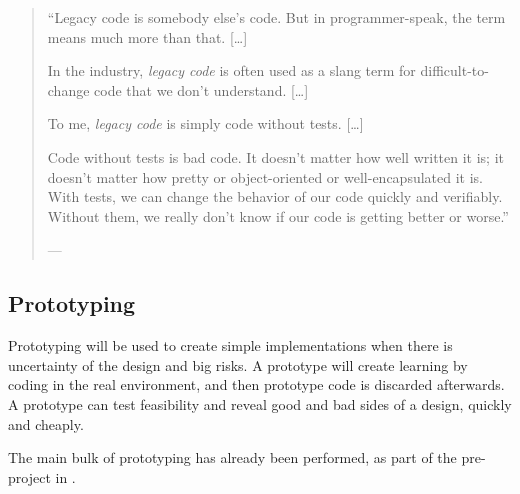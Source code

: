 \begin{quotation}
``Legacy code is somebody else’s code. But in programmer-speak, the term means much more than that. 
[\ldots]


In the industry, \textit{legacy code} is often used as a slang term for difficult-to-change code that we don’t understand. 
[\ldots]


To me, \textit{legacy code} is simply code without tests. [\ldots]


Code without tests is bad code. It doesn’t matter how well written it is; it doesn’t matter how pretty or object-oriented or well-encapsulated it is. With tests, we can change the behavior of our code quickly and verifiably. Without them, we really don’t know if our code is getting better or worse.''


---~\textcite{feathersWorkingEffectivelyLegacy2005}
\end{quotation}


\subsection{Prototyping}

Prototyping will be used to create simple implementations when there is uncertainty of the design and big risks.
A prototype will create learning by coding in the real environment, and then prototype code is discarded afterwards.
A prototype can test feasibility and reveal good and bad sides of a design, quickly and cheaply.


The main bulk of prototyping has already been performed, as part of the pre-project in \cite{rekstadModelingEnvironmentCloud2020}.
